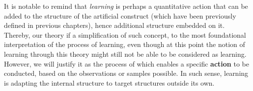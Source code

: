 It is notable to remind that \textit{learning} is perhaps a quantitative action that can be added to the structure of the artificial construct (which have been previously defined in previous chapters), hence additional structure embedded on it. Thereby, our theory if a simplification of such concept, to the most foundational interpretation of the process of learning, even though at this point the notion of learning through this theory might still not be able to be considered as learning. However, we will justify it as the process of which enables a specific \textbf{action} to be conducted, based on the observations or samples possible. In such sense, learning is adapting the internal structure to target structures outside its own. 
%
%
